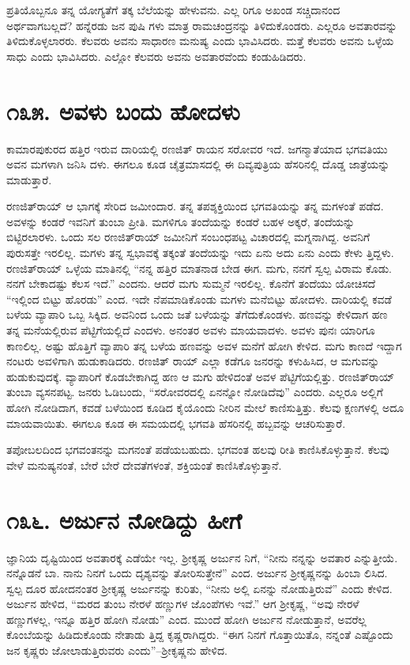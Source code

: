 ಪ್ರತಿಯೊಬ್ಬನೂ ತನ್ನ ಯೋಗ್ಯತೆಗೆ ತಕ್ಕ ಬೆಲೆಯನ್ನು ಹೇಳುವನು. ಎಲ್ಲ ರಿಗೂ ಅಖಂಡ ಸಚ್ಚಿದಾನಂದ ಅರ್ಥವಾಗಬಲ್ಲದೆ? ಹನ್ನೆರಡು ಜನ ಪುಷಿ ಗಳು ಮಾತ್ರ ರಾಮಚಂದ್ರನನ್ನು ತಿಳಿದುಕೊಂಡರು. ಎಲ್ಲರೂ ಅವತಾರವನ್ನು ತಿಳಿದುಕೊಳ್ಳಲಾರರು. ಕೆಲವರು ಅವನು ಸಾಧಾರಣ ಮನುಷ್ಯ ಎಂದು ಭಾವಿಸಿದರು. ಮತ್ತೆ ಕೆಲವರು ಅವನು ಒಳ್ಳೆಯ ಸಾಧು ಎಂದು ಭಾವಿಸಿದರು. ಎಲ್ಲೋ ಕೆಲವರು ಅವನು ಅವತಾರವೆಂದು ಕಂಡುಹಿಡಿದರು.


\section{\num{೧೩೫. } ಅವಳು ಬಂದು ಹೋದಳು}

ಕಾಮಾರಪುಕುರದ ಹತ್ತಿರ ಇರುವ ದಾರಿಯಲ್ಲಿ ರಣಜಿತ್ ರಾಯನ ಸರೋವರ ಇದೆ. ಜಗನ್ಮಾತೆಯಾದ ಭಗವತಿಯು ಅವನ ಮಗಳಾಗಿ ಜನಿಸಿ ದಳು. ಈಗಲೂ ಕೂಡ ಚೈತ್ರಮಾಸದಲ್ಲಿ ಈ ದಿವ್ಯಪುತ್ರಿಯ ಹೆಸರಿನಲ್ಲಿ ದೊಡ್ಡ ಜಾತ್ರೆಯನ್ನು ಮಾಡುತ್ತಾರೆ.

ರಣಜಿತ್​ರಾಯ್ ಆ ಭಾಗಕ್ಕೆ ಸೇರಿದ ಜಮೀಂದಾರ. ತನ್ನ ತಪಶ್ಶಕ್ತಿಯಿಂದ ಭಗವತಿಯನ್ನು ತನ್ನ ಮಗಳಂತೆ ಪಡೆದ. ಅವಳನ್ನು ಕಂಡರೆ ಇವನಿಗೆ ತುಂಬಾ ಪ್ರೀತಿ. ಮಗಳಿಗೂ ತಂದೆಯನ್ನು ಕಂಡರೆ ಬಹಳ ಅಕ್ಕರೆ, ತಂದೆಯನ್ನು ಬಿಟ್ಟಿರಲಾರಳು. ಒಂದು ಸಲ ರಣಜಿತ್​ರಾಯ್ ಜಮೀನಿಗೆ ಸಂಬಂಧಪಟ್ಟ ವಿಚಾರದಲ್ಲಿ ಮಗ್ನನಾಗಿದ್ದ. ಅವನಿಗೆ ಪುರುಸತ್ತೇ ಇರಲಿಲ್ಲ. ಮಗಳು ತನ್ನ ಸ್ವಭಾವಕ್ಕೆ ತಕ್ಕಂತೆ ತಂದೆಯನ್ನು ಇದು ಏನು ಅದು ಏನು ಎಂದು ಕೇಳು ತ್ತಿದ್ದಳು. ರಣಜಿತ್​ರಾಯ್ ಒಳ್ಳೆಯ ಮಾತಿನಲ್ಲಿ “ನನ್ನ ಹತ್ತಿರ ಮಾತನಾಡ ಬೇಡ ಈಗ. ಮಗು, ನನಗೆ ಸ್ವಲ್ಪ ವಿರಾಮ ಕೊಡು. ನನಗೆ ಬೇಕಾದಷ್ಟು ಕೆಲಸ ಇದೆ.” ಎಂದನು. ಆದರೆ ಮಗು ಸುಮ್ಮನೆ ಇರಲಿಲ್ಲ. ಕೊನೆಗೆ ತಂದೆಯು ಯೋಚಿಸದೆ “ಇಲ್ಲಿಂದ ಬಿಟ್ಟು ಹೊರಡು” ಎಂದ. ಇದೇ ನೆಪಮಾಡಿಕೊಂಡು ಮಗಳು ಮನೆಬಿಟ್ಟು ಹೋದಳು. ದಾರಿಯಲ್ಲಿ ಕವಡೆ ಬಳೆಯ ವ್ಯಾಪಾರಿ ಒಬ್ಬ ಸಿಕ್ಕಿದ. ಅವನಿಂದ ಒಂದು ಜತೆ ಬಳೆಯನ್ನು ತೆಗೆದುಕೊಂಡಳು. ಹಣವನ್ನು ಕೇಳಿದಾಗ ಹಣ ತನ್ನ ಮನೆಯಲ್ಲಿರುವ ಪೆಟ್ಟಿಗೆಯಲ್ಲಿದೆ ಎಂದಳು. ಅನಂತರ ಅವಳು ಮಾಯವಾದಳು. ಅವಳು ಪುನಃ ಯಾರಿಗೂ ಕಾಣಲಿಲ್ಲ. ಅಷ್ಟು ಹೊತ್ತಿಗೆ ವ್ಯಾಪಾರಿ ತನ್ನ ಬಳೆಯ ಹಣವನ್ನು ಅವಳ ಮನೆಗೆ ಹೋಗಿ ಕೇಳಿದ. ಮಗು ಕಾಣದೆ ಇದ್ದಾಗ ನಂಟರು ಅವಳಿಗಾಗಿ ಹುಡುಕಾಡಿದರು. ರಣಜಿತ್ ರಾಯ್ ಎಲ್ಲಾ ಕಡೆಗೂ ಜನರನ್ನು ಕಳುಹಿಸಿದ, ಆ ಮಗುವನ್ನು ಹುಡುಕುವುದಕ್ಕೆ. ವ್ಯಾಪಾರಿಗೆ ಕೊಡಬೇಕಾಗಿದ್ದ ಹಣ ಆ ಮಗು ಹೇಳಿದಂತೆ ಅವಳ ಪೆಟ್ಟಿಗೆಯಲ್ಲಿತ್ತು. ರಣಜಿತ್​ರಾಯ್ ತುಂಬಾ ವ್ಯಸನಪಟ್ಟ. ಜನರು ಓಡಿಬಂದು, “ಸರೋವರದಲ್ಲಿ ಏನನ್ನೋ ನೋಡಿದೆವು” ಎಂದರು. ಎಲ್ಲರೂ ಅಲ್ಲಿಗೆ ಹೋಗಿ ನೋಡಿದಾಗ, ಕವಡೆ ಬಳೆಯಿಂದ ಕೂಡಿದ ಕೈಯೊಂದು ನೀರಿನ ಮೇಲೆ ಕಾಣಿಸುತ್ತಿತ್ತು. ಕೆಲವು ಕ್ಷಣಗಳಲ್ಲಿ ಅದೂ ಮಾಯವಾಯಿತು. ಈಗಲೂ ಕೂಡ ಈ ಸಮಯದಲ್ಲಿ ಭಗವತಿ ಹೆಸರಿನಲ್ಲಿ ಹಬ್ಬವನ್ನು ಆಚರಿಸುತ್ತಾರೆ.

ತಪೋಬಲದಿಂದ ಭಗವಂತನನ್ನು ಮಗನಂತೆ ಪಡೆಯಬಹುದು. ಭಗವಂತ ಹಲವು ರೀತಿ ಕಾಣಿಸಿಕೊಳ್ಳುತ್ತಾನೆ. ಕೆಲವು ವೇಳೆ ಮನುಷ್ಯನಂತೆ, ಬೇರೆ ಬೇರೆ ದೇವತೆಗಳಂತೆ, ಶಕ್ತಿಯಂತೆ ಕಾಣಿಸಿಕೊಳ್ಳುತ್ತಾನೆ.


\section{\num{೧೩೬. } ಅರ್ಜುನ ನೋಡಿದ್ದು ಹೀಗೆ}

ಜ್ಞಾನಿಯ ದೃಷ್ಟಿಯಿಂದ ಅವತಾರಕ್ಕೆ ಎಡೆಯೇ ಇಲ್ಲ. ಶ್ರೀಕೃಷ್ಣ ಅರ್ಜುನ ನಿಗೆ, “ನೀನು ನನ್ನನ್ನು ಅವತಾರ ಎನ್ನುತ್ತೀಯೆ. ನನ್ನೊಡನೆ ಬಾ. ನಾನು ನಿನಗೆ ಒಂದು ದೃಶ್ಯವನ್ನು ತೋರಿಸುತ್ತೇನೆ” ಎಂದ. ಅರ್ಜುನ ಶ್ರೀಕೃಷ್ಣನನ್ನು ಹಿಂಬಾ ಲಿಸಿದ. ಸ್ವಲ್ಪ ದೂರ ಹೋದನಂತರ ಶ್ರೀಕೃಷ್ಣ ಅರ್ಜುನನ್ನು ಕುರಿತು, “ನೀನು ಅಲ್ಲಿ ಏನನ್ನು ನೋಡುತ್ತಿರುವೆ” ಎಂದು ಕೇಳಿದ. ಅರ್ಜುನ ಹೇಳಿದ, “ಮರದ ತುಂಬ ನೇರಳೆ ಹಣ್ಣುಗಳ ಜೊಂಪೆಗಳು ಇವೆ.” ಆಗ ಶ್ರೀಕೃಷ್ಣ, “ಅವು ನೇರಳೆ ಹಣ್ಣುಗಳಲ್ಲ, ಇನ್ನೂ ಹತ್ತಿರ ಹೋಗಿ ನೋಡು” ಎಂದ. ಮುಂದೆ ಹೋಗಿ ಅರ್ಜುನ ನೋಡುತ್ತಾನೆ, ಅವರೆಲ್ಲ ಕೊಂಬೆಯನ್ನು ಹಿಡಿದುಕೊಂಡು ನೇತಾಡು ತ್ತಿದ್ದ ಕೃಷ್ಣರಾಗಿದ್ದರು. “ಈಗ ನಿನಗೆ ಗೊತ್ತಾಯಿತೊ, ನನ್ನಂತೆ ಎಷ್ಟೊಂದು ಜನ ಕೃಷ್ಣರು ಜೋಲಾಡುತ್ತಿರುವರು ಎಂದು”–ಶ್ರೀಕೃಷ್ಣನು ಹೇಳಿದ.


